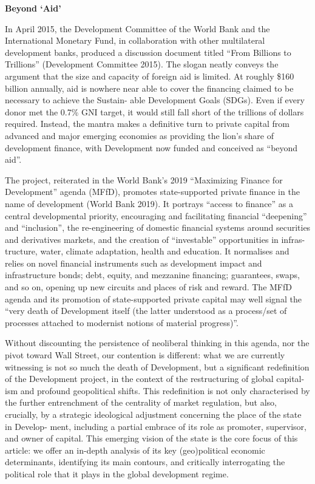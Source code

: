 \documentclass[
]{book}
\begin{document}
\textbf{Beyond `Aid'}

In April 2015, the Development Committee of the World Bank and
the International Monetary Fund, in collaboration with other
multilateral development banks,
produced a discussion document titled ``From Billions to Trillions'' (Development
Committee 2015). The slogan neatly conveys the argument that the size and
capacity of foreign aid is limited. At roughly \$160 billion annually, aid is nowhere
near able to cover the financing claimed to be necessary to achieve the Sustain-
able Development Goals (SDGs). Even if every donor met the 0.7\% GNI target, it
would still fall short of the trillions of dollars required. Instead, the mantra makes
a definitive turn to private capital from advanced and major emerging economies
as providing the lion's share of development finance, with Development now
funded and conceived as ``beyond aid''.

The project, reiterated in the World Bank's 2019 ``Maximizing Finance for
Development'' agenda (MFfD), promotes state-supported private finance in the
name of development (World Bank 2019). It portrays ``access to finance'' as a
central developmental priority, encouraging and facilitating financial ``deepening''
and ``inclusion'', the re-engineering of domestic financial systems around securities
and derivatives markets, and the creation of ``investable'' opportunities in infras-
tructure, water, climate adaptation, health and education. It normalises and relies
on novel financial instruments such as development impact and infrastructure
bonds; debt, equity, and mezzanine financing; guarantees, swaps, and so on,
opening up new circuits and places of risk and reward.
The MFfD agenda and its
promotion of state-supported private capital may well signal the ``very death of
Development itself (the latter understood as a process/set of processes attached
to modernist notions of material progress)''.

Without discounting the persistence of neoliberal thinking in this agenda, nor
the pivot toward Wall Street, our contention is different: what we are currently
witnessing is not so much the death of Development, but a significant redefinition
of the Development project, in the context of the restructuring of global capital-
ism and profound geopolitical shifts. This redefinition is not only characterised by
the further entrenchment of the centrality of market regulation, but also, crucially,
by a strategic ideological adjustment concerning the place of the state in Develop-
ment, including a partial embrace of its role as promoter, supervisor, and owner of
capital. This emerging vision of the state is the core focus of this article: we offer
an in-depth analysis of its key (geo)political economic determinants, identifying its
main contours, and critically interrogating the political role that it plays in the
global development regime.
\end{document}
